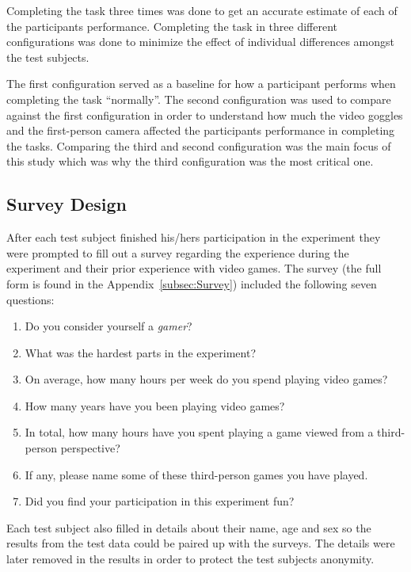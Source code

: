 \documentclass[runningheads,a4paper,oribibl]{llncs}
\begin{document}
Completing the task three times was done to get an accurate estimate of each of the participants performance. Completing the task in three different configurations was done to minimize the effect of individual differences amongst the test subjects. 

The first configuration served as a baseline for how a participant performs when completing the task ``normally''. The second configuration was used to compare against the first configuration in order to understand how much the video goggles and the first-person camera affected the participants performance in completing the tasks. Comparing the third and second configuration was the main focus of this study which was why the third configuration was the most critical one.















\subsection{Survey Design}
After each test subject finished his/hers participation in the experiment they were prompted to fill out a survey regarding the experience during the experiment and their prior experience with video games. The survey (the full form is found in the Appendix~\ref{subsec:Survey}) included the following seven questions:
\begin{enumerate}
	\item Do you consider yourself a \emph{gamer}?
	\item What was the hardest parts in the experiment?
	\item On average, how many hours per week do you spend playing video games?
	\item How many years have you been playing video games?
	\item In total, how many hours have you spent playing a game viewed from a third-person perspective?
	\item If any, please name some of these third-person games you have played.
	\item Did you find your participation in this experiment fun?
\end{enumerate}
Each test subject also filled in details about their name, age and sex so the results from the test data could be paired up with the surveys. The details were later removed in the results in order to protect the test subjects anonymity.
\end{document}
